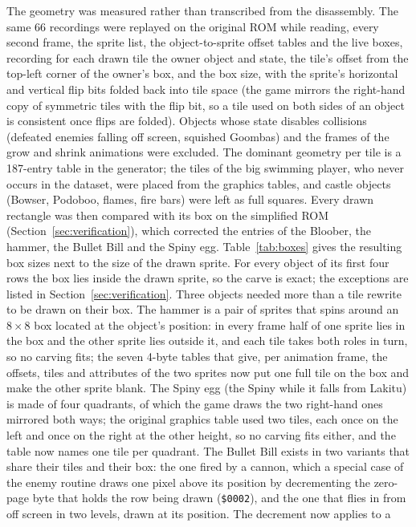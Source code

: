 \documentclass{article}
\newcommand{\hex}[1]{\texttt{\$#1}}
\begin{document}
The geometry was measured rather than transcribed from the disassembly. The same 66 recordings
were replayed on the original ROM while reading, every second frame, the sprite list, the
object-to-sprite offset tables and the live boxes, recording for each drawn tile the owner object
and state, the tile's offset from the top-left corner of the owner's box, and the box size, with
the sprite's horizontal and vertical flip bits folded back into tile space (the game mirrors the
right-hand copy of symmetric tiles with the flip bit, so a tile used on both sides of an object is
consistent once flips are folded). Objects whose state disables collisions (defeated enemies
falling off screen, squished Goombas) and the frames of the grow and shrink animations were
excluded. The dominant geometry per tile is a 187-entry table in the generator; the tiles of the
big swimming player, who never occurs in the dataset, were placed from the graphics tables, and
castle objects (Bowser, Podoboo, flames, fire bars) were left as full squares. Every drawn
rectangle was then compared with its box on the simplified ROM (Section~\ref{sec:verification}),
which corrected the entries of the Bloober, the hammer, the Bullet Bill and the Spiny egg. Table~\ref{tab:boxes}
gives the resulting box sizes next to the size of the drawn sprite. For every object of its first
four rows the box lies inside the drawn sprite, so the carve is exact; the exceptions are listed
in Section~\ref{sec:verification}. Three objects needed more than a tile rewrite to be drawn on
their box. The hammer is a pair of sprites that spins around an $8\times8$ box located at the
object's position: in every frame half of one sprite lies in the box and the other sprite lies
outside it, and each tile takes both roles in turn, so no carving fits; the seven 4-byte tables
that give, per animation frame, the offsets, tiles and attributes of the two sprites now put one
full tile on the box and make the other sprite blank. The Spiny egg (the Spiny while it falls from
Lakitu) is made of four quadrants, of which the game draws the two right-hand ones mirrored both
ways; the original graphics table used two tiles, each once on the left and once on the right at
the other height, so no carving fits either, and the table now names one tile per quadrant. The
Bullet Bill exists in two variants that share their tiles and their box: the one fired by a
cannon, which a special case of the enemy routine draws one pixel above its position by
decrementing the zero-page byte that holds the row being drawn (\hex{0002}), and the one that
flies in from off screen in two levels, drawn at its position. The decrement now applies to a
\end{document}
